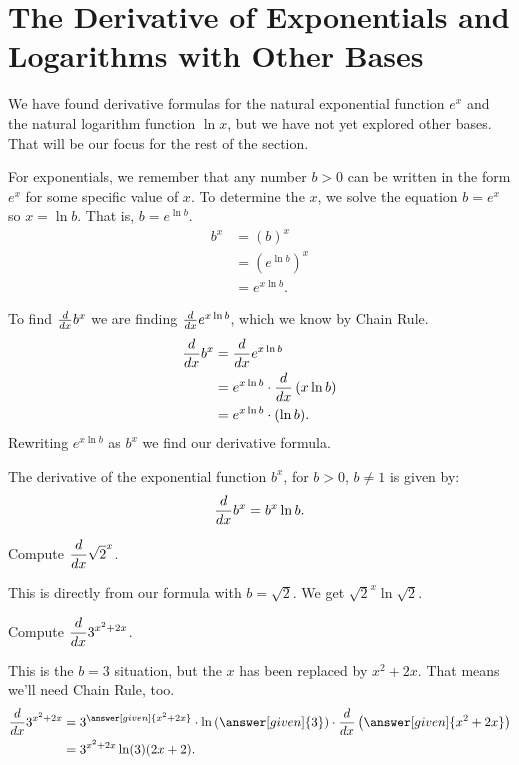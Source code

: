 \documentclass{ximera}
\begin{document}
\section{The Derivative of Exponentials and Logarithms with Other Bases}
We have found derivative formulas for the natural exponential function $e^x$ and the natural logarithm function $\ln x$, but we have not
yet explored other bases.  That will be our focus for the rest of the section. 

For exponentials, we remember that any number $b > 0$ can be written in the form $e^x$ for some specific value of $x$.  To determine the $x$,
we solve the equation $b = e^x$ so $x = \ln b$.  That is, $b = e^{\ln b}$.  
\begin{align*}
	b^x &= (b)^x\\
		&= \left( e^{\ln b} \right)^x\\
		&= e^{x \ln b}.
\end{align*}

To find $\frac{d}{\mathop{}\!d x} b^x$ we are finding $\frac{d}{\mathop{}\!d x} e^{x \ln b}$, which we know by Chain Rule.
\begin{align*} 
	\frac{d}{\mathop{}\!d x} b^x &= \frac{d}{\mathop{}\!d x} e^{x \ln b}\\
		&= e^{x \ln b} \cdot \frac{d}{\mathop{}\!d x} \left( x \ln b \right)\\ 
		&= e^{x \ln b} \cdot (\ln b).
\end{align*}
Rewriting $e^{x \ln b}$ as $b^x$ we find our derivative formula.
\begin{theorem}
	The derivative of the exponential function $b^x$, for $b > 0$, $b \neq 1$ is given by:
	\[ \frac{d}{\mathop{}\!d x} b^x = b^x \ln b. \]
\end{theorem}

\begin{example}
	Compute $\displaystyle \frac{d}{\mathop{}\!d x} \sqrt{2}^x$.
	\begin{explanation}
		This is directly from our formula with $b = \sqrt{2}$.  We get  $\displaystyle \sqrt{2}^x \ln\sqrt 2$.
	\end{explanation}
\end{example}

\begin{example}
	Compute $\displaystyle \frac{d}{\mathop{}\!d x} 3^{x^2+2x}$.
	\begin{explanation}
		This is the $b=3$ situation, but the $x$ has been replaced by $x^2 + 2x$.  That means we'll need Chain Rule, too.
		\begin{align*}
			\ddx 3^{x^2 + 2x} &= 3^{\answer[given]{x^2+2x}} \cdot \ln \left( \answer[given]{3} \right) \cdot \ddx \left(  \answer[given]{x^2+2x}\right)\\
				&= 3^{x^2+2x} \ln(3) (2x+2).
		\end{align*}
	\end{explanation}
\end{example}
\end{document}
